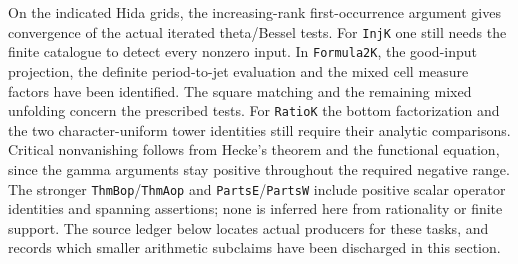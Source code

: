 On the indicated Hida grids, the increasing-rank first-occurrence
argument gives convergence of the actual iterated theta/Bessel tests.
For \texttt{InjK} one still needs the finite catalogue to detect
every nonzero input. In \texttt{Formula2K}, the good-input
projection, the definite period-to-jet evaluation and the mixed
cell measure factors have been identified. The square matching
and the remaining mixed unfolding concern the prescribed tests.
For \texttt{RatioK} the bottom factorization and the two
character-uniform tower identities still require their analytic
comparisons. Critical nonvanishing follows from Hecke's theorem
and the functional equation, since the gamma arguments stay
positive throughout the required negative range.
The stronger
\texttt{ThmBop}/\texttt{ThmAop} and
\texttt{PartsE}/\texttt{PartsW} include positive scalar operator
identities and spanning assertions; none is inferred here from
rationality or finite support. The source ledger below locates
actual producers for these tasks, and records which smaller
arithmetic subclaims have been discharged in this section.
